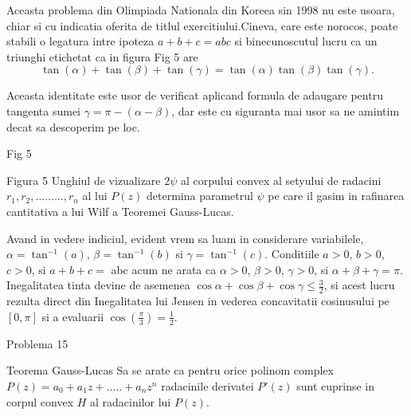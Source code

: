\documentclass[a4paper,12pt,oneside]{report}
\begin{document}
Aceasta problema din Olimpiada Nationala din Koreea sin 1998 nu este usoara, chiar si cu indicatia oferita de titlul exercitiului.Cineva, care este norocos, poate stabili o legatura intre  ipoteza \(a + b + c = abc\) si binecunoscutul lucru ca un triunghi etichetat ca in figura Fig 5 
 are 
 \begin{displaymath}
   \tan\left ( \alpha  \right ) + \tan\left ( \beta   \right ) + \tan\left ( \gamma   \right ) = \tan\left ( \alpha  \right )\tan\left ( \beta   \right )\tan\left ( \gamma   \right ). 
 \end{displaymath}

Aceasta identitate este usor de verificat aplicand formula de adaugare pentru tangenta sumei \(\gamma  = \pi  - \left ( \alpha  - \beta  \right )\), dar este cu siguranta mai usor sa ne amintim decat sa descoperim pe loc. 


Fig 5


Figura 5  Unghiul de vizualizare \(2\psi\) al corpului convex al setyului de radacini \(r_{1} , r_{2} , ........., r_{n}\) al lui \(P\left ( z \right )\) determina parametrul \(\psi\) pe care il gasim in rafinarea cantitativa a lui Wilf a Teoremei Gauss-Lucas. 

Avand in vedere indiciul, evident vrem sa luam in considerare variabilele,  \(\alpha  = \tan^{-1}\left ( a \right )\), \(\beta = \tan ^{-1}\left ( b \right )\) si \(\gamma  = \tan ^{-1}\left ( c \right )\). Conditiile \(a> 0\), \(b> 0\), \(c> 0\), si \(a+b+c =\) abc acum ne arata ca \(\alpha > 0 \), \(\beta > 0 \), \(\gamma > 0\), si \(\alpha + \beta + \gamma  = \pi\). Inegalitatea tinta devine de asemenea \(\cos \alpha  + \cos \beta  + \cos \gamma  \leq \frac{3}{2}\), si acest lucru rezulta direct din Inegalitatea lui Jensen  in vederea concavitatii cosinusului pe \(\left [ 0 , \pi  \right ]\)  si a evaluarii \(\cos \left ( \frac{\pi }{3} \right ) = \frac{1}{2}\). 

Problema 15 

Teorema Gauss-Lucas
Sa se arate ca pentru orice polinom complex \(P\left ( z \right ) = a_{0} + a_{1}z + ..... +a_{n}z^{n}\) radacinile derivatei \({P}'\left ( z \right )\) sunt cuprinse in corpul convex \(H\) al radacinilor lui \(P\left ( z \right )\). 
\end{document}
